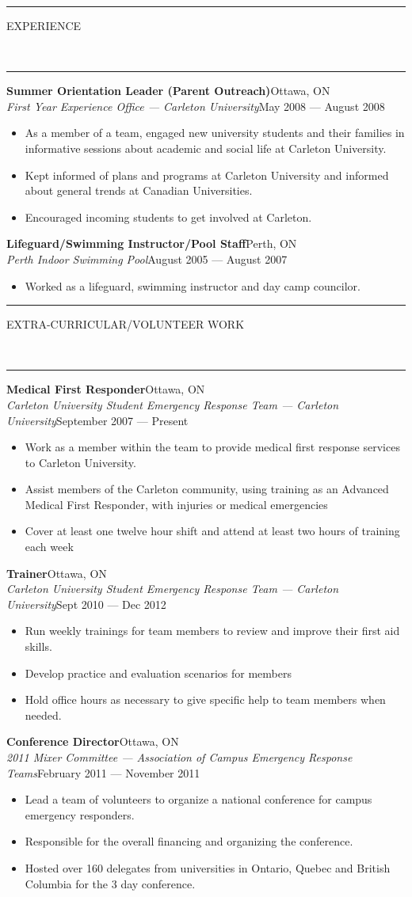 \documentclass[10pt, letterpaper, oneside]{article}
\newcommand{\HRule}[2]{\textcolor{#1}{\rule{\linewidth}{#2}}}
\newcommand{\sectiontitle}[1]{\begin{minipage}{\textwidth}\HRule{black}{0.25mm}\vspace{-10pt}\begin{center}\Large\MakeUppercase{#1}\end{center}\end{minipage}\\\HRule{light-grey}{0.15mm}\vspace{\baselineskip}}
\newenvironment{ressection}[1]{
  \sectiontitle{#1}}
  {\vspace{-\baselineskip}}
\newcommand{\resitem}[1]{
	\vspace{2pt}
	\item \begin{flushleft} #1 \end{flushleft}
}
\newcommand{\resentryheader}[4]{
	\vspace{-5pt}
	\textbf{#1}\hspace{\stretch{1}}\textcolor{light-grey}{#3}\\
	\textit{#2}\hspace{\stretch{1}}\textcolor{light-grey}{#4}\\
}
\newenvironment{resentry}[4]{
  \begin{minipage}{\textwidth}
	\resentryheader{#1}{#2}{#3}{#4}
        \vspace{-\baselineskip}
	\begin{itemize}[noitemsep,nolistsep]
}{
	\end{itemize}
        \vspace{\baselineskip}
        \end{minipage}
}
\begin{document}
\begin{ressection}{experience}
  \begin{resentry}{Summer Orientation Leader (Parent Outreach)}{First Year Experience Office --- Carleton University}{Ottawa, ON}{May 2008 --- August 2008}
    \resitem{As a member of a team, engaged new university students and their families in informative sessions about academic and social life at Carleton University.}
    \resitem{Kept informed of plans and programs at Carleton University and informed about general trends at 
Canadian Universities.}
    \resitem{Encouraged incoming students to get involved at Carleton.}
  \end{resentry}

  \begin{resentry}{Lifeguard/Swimming Instructor/Pool Staff}{Perth Indoor Swimming Pool}{Perth, ON}{August 2005 --- August 2007}
    \resitem{Worked as a lifeguard, swimming instructor and day camp councilor.}
  \end{resentry}

\end{ressection}

\begin{ressection}{Extra-Curricular/Volunteer work}
  \begin{resentry}{Medical First Responder}{Carleton University Student Emergency Response Team --- Carleton University}{Ottawa, ON}{September 2007 --- Present}
    \resitem{Work as a member within the team to provide medical first response services to Carleton University.}
    \resitem{Assist members of the Carleton community, using training as an Advanced Medical First Responder, with injuries or medical emergencies}
    \resitem{Cover at least one twelve hour shift and attend at least two hours of training each week}
  \end{resentry}

  \begin{resentry}{Trainer}{Carleton University Student Emergency Response Team --- Carleton University}{Ottawa, ON}{Sept 2010 --- Dec 2012}
    \resitem{Run weekly trainings for team members to review and improve their first aid skills.}
    \resitem{Develop practice and evaluation scenarios for members}
    \resitem{Hold office hours as necessary to give specific help to team members when needed.}
  \end{resentry}

  \begin{resentry}{Conference Director}{2011 Mixer Committee --- Association of Campus Emergency Response Teams}{Ottawa, ON}{February 2011 --- November 2011}
    \resitem{Lead a team of volunteers to organize a national conference for campus emergency responders.}
    \resitem{Responsible for the overall financing and organizing the conference.}
    \resitem{Hosted over 160 delegates from universities in Ontario, Quebec and British Columbia for the 3 day conference.}
  \end{resentry}

\end{ressection}
    
\end{document}
